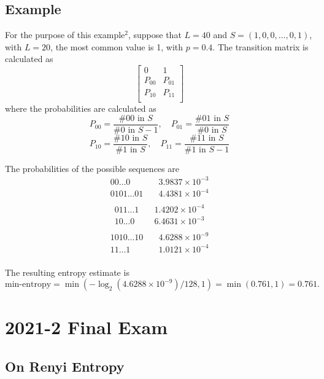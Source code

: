 \documentclass[12pt,openany]{book}
\theoremstyle{definition}
\begin{document}
\section*{Example}
For the purpose of this example\(^2\), suppose that \(L = 40\) and \(S = (1, 0, 0, \ldots, 0, 1)\), with \(L = 20\), the most common value is 1, with \(p = 0.4\). The transition matrix is calculated as
\[
\begin{bmatrix}
	0 & 1 \\
	P_{00} & P_{01} \\
	P_{10} & P_{11} \\
\end{bmatrix}
\]
where the probabilities are calculated as
\[
P_{00} = \frac{\#00 \text{ in } S}{\#0 \text{ in } S - 1}, \quad P_{01} = \frac{\#01 \text{ in } S}{\#0 \text{ in } S}
\]
\[
P_{10} = \frac{\#10 \text{ in } S}{\#1 \text{ in } S}, \quad P_{11} = \frac{\#11 \text{ in } S}{\#1 \text{ in } S - 1}
\]

The probabilities of the possible sequences are
\[
\begin{aligned}
	00...0 &\quad 3.9837 \times 10^{-3} \\
	0101...01 &\quad 4.4381 \times 10^{-4} \\
\end{aligned}
\]
\[
\begin{aligned}
	011...1 &\quad 1.4202 \times 10^{-4} \\
	10...0 &\quad 6.4631 \times 10^{-3} \\
\end{aligned}
\]
\[
\begin{aligned}
	1010...10 &\quad 4.6288 \times 10^{-9} \\
	11...1 &\quad 1.0121 \times 10^{-4} \\
\end{aligned}
\]

The resulting entropy estimate is
\[ \text{min-entropy} = \min(-\log_2(4.6288 \times 10^{-9})/128, 1) = \min(0.761, 1) = 0.761. \]

\newpage

\chapter{2021-2 Final Exam}


\section{On Renyi Entropy}
\end{document}
